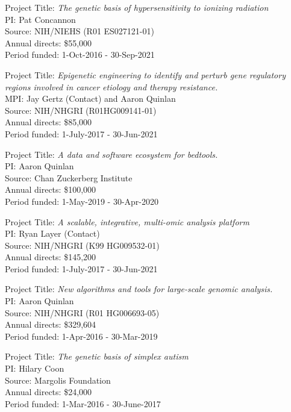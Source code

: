 \documentclass[margin,line]{cv}
\begin{document}
\begin{resume}
    Project Title: \textit{The genetic basis of hypersensitivity to ionizing radiation} \\
    PI: Pat Concannon \\
    Source: NIH/NIEHS (R01 ES027121-01) \\
    Annual directs: \$55,000 \\
    Period funded: 1-Oct-2016 - 30-Sep-2021 

    Project Title: \textit{Epigenetic engineering to identify and perturb gene regulatory regions involved in cancer etiology and therapy resistance.} \\
    MPI: Jay Gertz (Contact) and Aaron Quinlan \\
    Source: NIH/NHGRI (R01HG009141-01) \\
    Annual directs: \$85,000 \\
    Period funded: 1-July-2017 - 30-Jun-2021 

    Project Title: \textit{A data and software ecosystem for bedtools.} \\
    PI: Aaron Quinlan \\
    Source: Chan Zuckerberg Institute \\
    Annual directs: \$100,000 \\
    Period funded: 1-May-2019 - 30-Apr-2020

    Project Title: \textit{A scalable, integrative, multi-omic analysis platform} \\
    PI: Ryan Layer (Contact) \\
    Source: NIH/NHGRI (K99 HG009532-01) \\
    Annual directs: \$145,200 \\
    Period funded: 1-July-2017 - 30-Jun-2021 

    Project Title: \textit{New algorithms and tools for large-scale genomic analysis.} \\
    PI: Aaron Quinlan \\
    Source: NIH/NHGRI (R01 HG006693-05) \\
    Annual directs: \$329,604 \\
    Period funded: 1-Apr-2016 - 30-Mar-2019 

    Project Title: \textit{The genetic basis of simplex autism} \\
    PI: Hilary Coon \\
    Source: Margolis Foundation \\
    Annual directs: \$24,000 \\
    Period funded: 1-Mar-2016 - 30-June-2017


\end{resume}
\end{document}
